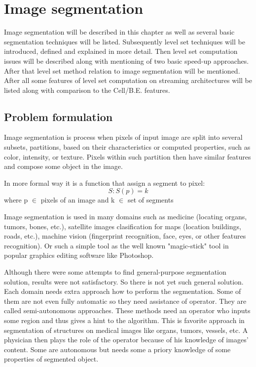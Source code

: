 \chapter{Image segmentation}

Image segmentation will be described in this chapter as well as several basic segmentation techniques will be listed.
Subsequently level set techniques will be introduced, defined and explained in more detail.
Then level set computation issues will be described along with mentioning of two basic speed-up approaches.
After that level set method relation to image segmentation will be mentioned.
After all some features of level set computation on streaming architectures will be listed along with comparison to the Cell/B.E. features.

\section{Problem formulation}
Image segmentation is process when pixels of input image are split into several subsets, partitions, based on their characteristics or computed properties, such as color, intensity, or texture.
Pixels within such partition then have similar features and compose some object in the image.

In more formal way it is a function that assign a segment to pixel:
\begin{equation}
S: S(p) = k
\end{equation}
where p $\in$ pixels of an image and k $\in$ set of segments

Image segmentation is used in many domains such as medicine (locating organs, tumors, bones, etc.), satellite images clasification for maps (location buildings, roads, etc.), machine vision (fingerprint recognition, face, eyes, or other features recognition).
Or such a simple tool as the well known "magic-stick" tool in popular graphics editing software like Photoshop.

Although there were some attempts to find general-purpose segmentation solution, results were not satisfactory.
So there is not yet such general solution.
Each domain needs extra approach how to perform the segmentation.
Some of them are not even fully automatic so they need assistance of operator.
They are called semi-autonomous approaches.
These methods need an operator who inputs some region and thus gives a hint to the algorithm.
This is favorite approach in segmentation of structures on medical images like organs, tumors, vessels, etc.
A physician then plays the role of the operator because of his knowledge of images' content.
Some are autonomous but needs some a priory knowledge of some properties of segmented object.

